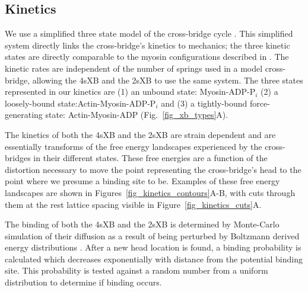 \documentclass[]{article}
\begin{document}
\subsection*{Kinetics} %

We use a simplified three state model of the cross-bridge cycle \citep{Pate1989, Tanner2007}. 
This simplified system directly links the cross-bridge's kinetics to mechanics; the three kinetic states are directly comparable to the myosin configurations described in \citet{Houdusse2000}. 
The kinetic rates are independent of the number of springs used in a model cross-bridge, allowing the 4sXB and the 2sXB to use the same system. 
The three states represented in our kinetics are (1) an unbound state: Myosin-ADP-P$_i$ (2) a loosely-bound state:Actin-Myosin-ADP-P$_i$ and (3) a tightly-bound force-generating state: Actin-Myosin-ADP (Fig.~\ref{fig_xb_types}A).

The kinetics of both the 4sXB and the 2sXB are strain dependent and are essentially transforms of the free energy landscapes experienced by the cross-bridges in their different states.
These free energies are a function of the distortion necessary to move the point representing the cross-bridge's head to the point where we presume a binding site to be.
Examples of these free energy landscapes are shown in Figures~\ref{fig_kinetics_contours}A-B, with cuts through them at the rest lattice spacing visible in Figure~\ref{fig_kinetics_cuts}A.

The binding of both the 4sXB and the 2sXB is determined by Monte-Carlo simulation of their diffusion as a result of being perturbed by Boltzmann derived energy distributions \citep{DillBook}. 
After a new head location is found, a binding probability is calculated which decreases exponentially with distance from the potential binding site. 
This probability is tested against a random number from a uniform distribution to determine if binding occurs.
\end{document}
